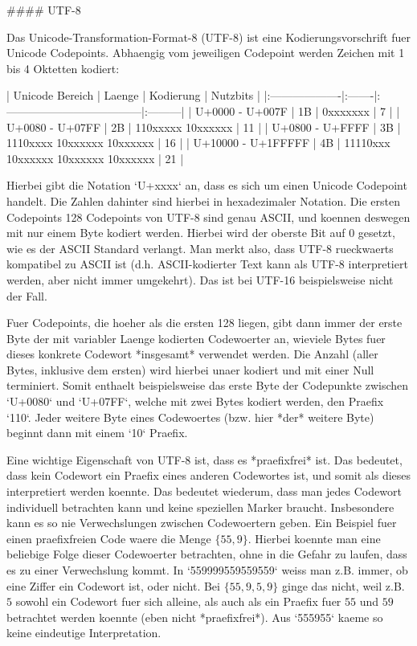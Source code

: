 #### UTF-8

Das Unicode-Transformation-Format-8 (UTF-8) ist eine Kodierungsvorschrift fuer
Unicode Codepoints. Abhaengig vom jeweiligen Codepoint werden Zeichen mit 1 bis
4 Oktetten kodiert:

| Unicode Bereich    | Laenge |             Kodierung               | Nutzbits |
|:-------------------|:-------|:------------------------------------|:---------|
| U+0000 - U+007F    |   1B   | 0xxxxxxx                            |    7     |
| U+0080 - U+07FF    |   2B   | 110xxxxx 10xxxxxx                   |    11    |
| U+0800 - U+FFFF    |   3B   | 1110xxxx 10xxxxxx 10xxxxxx          |    16    |
| U+10000 - U+1FFFFF |   4B   | 11110xxx 10xxxxxx 10xxxxxx 10xxxxxx |    21    |

Hierbei gibt die Notation `U+xxxx` an, dass es sich um einen Unicode Codepoint
handelt. Die Zahlen dahinter sind hierbei in hexadezimaler Notation. Die ersten
Codepoints 128 Codepoints von UTF-8 sind genau ASCII, und koennen deswegen mit
nur einem Byte kodiert werden. Hierbei wird der oberste Bit auf 0 gesetzt, wie
es der ASCII Standard verlangt. Man merkt also, dass UTF-8 rueckwaerts
kompatibel zu ASCII ist (d.h. ASCII-kodierter Text kann als UTF-8 interpretiert
werden, aber nicht immer umgekehrt). Das ist bei UTF-16 beispielsweise nicht der
Fall.

Fuer Codepoints, die hoeher als die ersten 128 liegen, gibt dann immer der erste
Byte der mit variabler Laenge kodierten Codewoerter an, wieviele Bytes fuer
dieses konkrete Codewort *insgesamt* verwendet werden. Die Anzahl (aller Bytes,
inklusive dem ersten) wird hierbei unaer kodiert und mit einer Null
terminiert. Somit enthaelt beispielsweise das erste Byte der Codepunkte zwischen
`U+0080` und `U+07FF`, welche mit zwei Bytes kodiert werden, den Praefix
`110`. Jeder weitere Byte eines Codewoertes (bzw. hier *der* weitere Byte)
beginnt dann mit einem `10` Praefix.

Eine wichtige Eigenschaft von UTF-8 ist, dass es *praefixfrei* ist. Das
bedeutet, dass kein Codewort ein Praefix eines anderen Codewortes ist, und somit
als dieses interpretiert werden koennte. Das bedeutet wiederum, dass man jedes
Codewort individuell betrachten kann und keine speziellen Marker
braucht. Insbesondere kann es so nie Verwechslungen zwischen Codewoertern
geben. Ein Beispiel fuer einen praefixfreien Code waere die Menge $\{55,
9\}$. Hierbei koennte man eine beliebige Folge dieser Codewoerter betrachten,
ohne in die Gefahr zu laufen, dass es zu einer Verwechslung kommt. In
`559999559559559` weiss man z.B. immer, ob eine Ziffer ein Codewort ist, oder
nicht. Bei $\{55, 9, 5, 9\}$ ginge das nicht, weil z.B. $5$ sowohl ein Codewort
fuer sich alleine, als auch als ein Praefix fuer $55$ und $59$ betrachtet werden
koennte (eben nicht *praefixfrei*). Aus `555955` kaeme so keine eindeutige
Interpretation.

